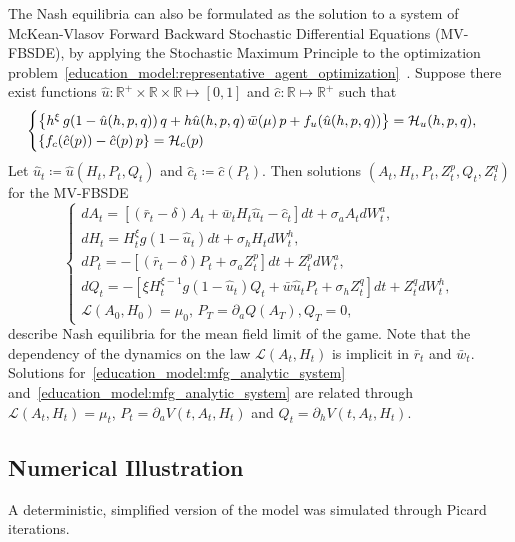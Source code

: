 The Nash equilibria can also be formulated as the solution to a system of 
McKean-Vlasov Forward Backward Stochastic Differential Equations (MV-FBSDE),
by applying the Stochastic Maximum Principle to the optimization problem~\eqref{education_model:representative_agent_optimization}~\cite{carmona2018probabilistic}.
Suppose there exist functions $\hat u : \mathbb{R}^+ \times \mathbb{R} \times \mathbb{R} \mapsto [0,1] $ and $\hat c : \mathbb{R} \mapsto \mathbb{R}^+$ such that
\begin{equation}
    \begin{cases}
         \left \{ h^\xi \, g(1 - {\hat u}(h,p,q))\, q + h {\hat u}(h,p,q) \, \bar w (\mu)\, p + f_u({\hat u}(h,p,q))\right\} = \mathcal{H}_u(h,p,q),\\
         \left \{  f_c({\hat c}(p)) - {\hat c}(p) \, p \right \} = \mathcal{H}_c(p)
    \end{cases}
\end{equation}
Let $\hat u_t \coloneqq \hat u(H_t,P_t,Q_t)$ and $\hat c_t \coloneqq \hat c(P_t)$.
Then solutions $(A_t, H_t, P_t, Z^p_t, Q_t, Z^q_t)$ for the MV-FBSDE
\begin{equation}\label{education_model:mfg_fbsde_system}
    \begin{cases}
        d A_t = \left[ (\bar r_t - \delta) A_t + \bar w_t H_t {\hat u}_t - {\hat c}_t  \right] dt + \sigma_a A_t d W^a_t,\\
        d H_t = H^\xi_t g(1 - {\hat u}_t) dt + \sigma_h H_t d W^h_t,\\
        d P_t = -\left[ (\bar r_t - \delta) P_t + \sigma_a Z^p_t \right]dt + Z^p_t d W^a_t,\\
        d Q_t = - \left[ \xi H_t^{\xi - 1} g(1 - {\hat u}_t ) Q_t + {\bar w} {\hat u}_t P_t + \sigma_h Z^q_t \right] dt + Z^q_t d W^h_t,\\
        \mathcal{L}(A_0, H_0) = \mu_0, \, P_T = \partial_a Q(A_T), Q_T = 0,
    \end{cases}
\end{equation}
describe Nash equilibria for the mean field limit of the game.
Note that the dependency of the dynamics on the law $\mathcal{L}(A_t,H_t)$ is implicit in $\bar r_t$ and $\bar w_t$.
Solutions for~\eqref{education_model:mfg_analytic_system} and~\eqref{education_model:mfg_analytic_system} are related through $\mathcal{L}(A_t, H_t) = \mu_t$, $P_t = \partial_a V(t,A_t,H_t)$ and $Q_t = \partial_h V(t,A_t,H_t)$.

\subsection{Numerical Illustration}
        A deterministic, simplified version of the model was simulated through Picard iterations.
        
